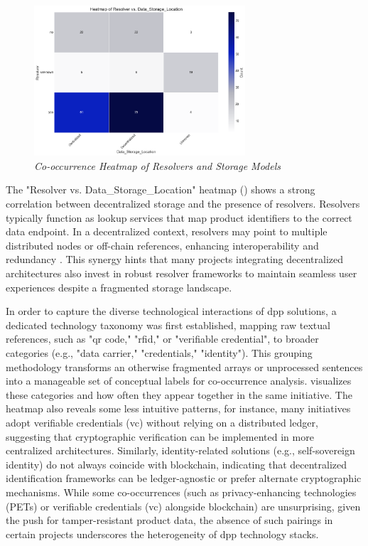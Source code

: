 \begin{figure}[htbp]
  \centering
  \includegraphics[width=0.7\textwidth]{figures/initiatives_resolver_vs_storage.png}
  \caption{%
    \textit{Co-occurrence Heatmap of Resolvers and Storage Models} 
  }
  \label{fig:initiatives_resolver_vs_storage}
\end{figure}

The "Resolver vs. Data\_Storage\_Location" heatmap () shows a strong correlation between decentralized storage and the presence of resolvers. Resolvers typically function as lookup services that map product identifiers to the correct data endpoint. In a decentralized context, resolvers may point to multiple distributed nodes or off-chain references, enhancing interoperability and redundancy \autocite{Liu.2022}. This synergy hints that many projects integrating decentralized architectures also invest in robust resolver frameworks to maintain seamless user experiences despite a fragmented storage landscape.

In order to capture the diverse technological interactions of \ac{dpp} solutions, a dedicated technology taxonomy was first established, mapping raw textual references, such as "qr code," "rfid," or "verifiable credential", to broader categories (e.g., "data carrier," "credentials," "identity"). This grouping methodology transforms an otherwise fragmented arrays or unprocessed sentences into a manageable set of conceptual labels for co-occurrence analysis.  visualizes these categories and how often they appear together in the same initiative. The heatmap also reveals some less intuitive patterns, for instance, many initiatives adopt verifiable credentials (\ac{vc}) without relying on a distributed ledger, suggesting that cryptographic verification can be implemented in more centralized architectures. Similarly, identity-related solutions (e.g., self-sovereign identity) do not always coincide with blockchain, indicating that decentralized identification frameworks can be ledger-agnostic or prefer alternate cryptographic mechanisms. While some co-occurrences (such as privacy-enhancing technologies (PETs) or verifiable credentials (\ac{vc}) alongside blockchain) are unsurprising, given the push for tamper-resistant product data, the absence of such pairings in certain projects underscores the heterogeneity of \ac{dpp} technology stacks. \autocite{Narayanan.2016}

